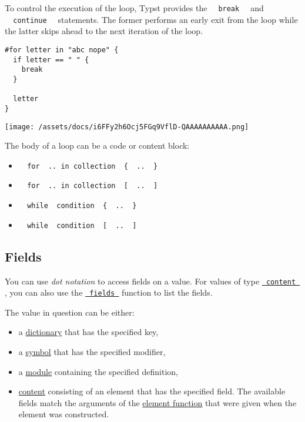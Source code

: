 To control the execution of the loop, Typst provides the
\texttt{\ }{\texttt{\ break\ }}\texttt{\ } and
\texttt{\ }{\texttt{\ continue\ }}\texttt{\ } statements. The former
performs an early exit from the loop while the latter skips ahead to the
next iteration of the loop.

\begin{verbatim}
#for letter in "abc nope" {
  if letter == " " {
    break
  }

  letter
}
\end{verbatim}

\texttt{[image: /assets/docs/i6FFy2h6Ocj5FGq9VflD-QAAAAAAAAAA.png]}

The body of a loop can be a code or content block:

\begin{itemize}
\tightlist
\item
  \texttt{\ }{\texttt{\ for\ }}\texttt{\ ..\ in\ collection\ }{\texttt{\ \{\ }}\texttt{\ ..\ }{\texttt{\ \}\ }}\texttt{\ }
\item
  \texttt{\ }{\texttt{\ for\ }}\texttt{\ ..\ in\ collection\ }{\texttt{\ {[}\ }}\texttt{\ ..\ }{\texttt{\ {]}\ }}\texttt{\ }
\item
  \texttt{\ }{\texttt{\ while\ }}\texttt{\ condition\ }{\texttt{\ \{\ }}\texttt{\ ..\ }{\texttt{\ \}\ }}\texttt{\ }
\item
  \texttt{\ }{\texttt{\ while\ }}\texttt{\ condition\ }{\texttt{\ {[}\ }}\texttt{\ ..\ }{\texttt{\ {]}\ }}\texttt{\ }
\end{itemize}

\subsection{Fields}\label{fields}

You can use \emph{dot notation} to access fields on a value. For values
of type
\href{/docs/reference/foundations/content/}{\texttt{\ content\ }} , you
can also use the
\href{/docs/reference/foundations/content/\#definitions-fields}{\texttt{\ fields\ }}
function to list the fields.

The value in question can be either:

\begin{itemize}
\tightlist
\item
  a \href{/docs/reference/foundations/dictionary/}{dictionary} that has
  the specified key,
\item
  a \href{/docs/reference/symbols/symbol/}{symbol} that has the
  specified modifier,
\item
  a \href{/docs/reference/foundations/module/}{module} containing the
  specified definition,
\item
  \href{/docs/reference/foundations/content/}{content} consisting of an
  element that has the specified field. The available fields match the
  arguments of the
  \href{/docs/reference/foundations/function/\#element-functions}{element
  function} that were given when the element was constructed.
\end{itemize}

